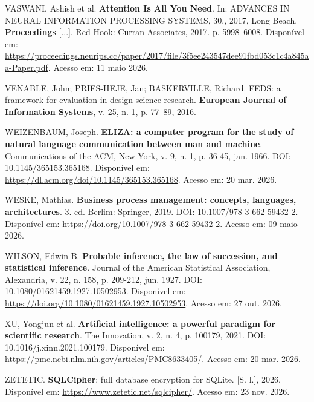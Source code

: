 \documentclass[12pt,a4paper]{extarticle}
\begin{document}
\vspace{0.5cm}\noindent
VASWANI, Ashish et al. \textbf{Attention Is All You Need}. In: ADVANCES IN NEURAL INFORMATION PROCESSING SYSTEMS, 30., 2017, Long Beach. \textbf{Proceedings} [...]. Red Hook: Curran Associates, 2017. p. 5998--6008. Disponível em: \url{https://proceedings.neurips.cc/paper/2017/file/3f5ee243547dee91fbd053c1c4a845aa-Paper.pdf}. Acesso em: 11 maio 2026.

\vspace{0.5cm}\noindent
VENABLE, John; PRIES-HEJE, Jan; BASKERVILLE, Richard. FEDS: a framework for evaluation in design science research. \textbf{European Journal of Information Systems}, v. 25, n. 1, p. 77--89, 2016.

\vspace{0.5cm}\noindent
WEIZENBAUM, Joseph. \textbf{ELIZA: a computer program for the study of natural language communication between man and machine}. Communications of the ACM, New York, v. 9, n. 1, p. 36-45, jan. 1966. DOI: 10.1145/365153.365168. Disponível em: \url{https://dl.acm.org/doi/10.1145/365153.365168}. Acesso em: 20 mar. 2026.

\vspace{0.5cm}\noindent
WESKE, Mathias. \textbf{Business process management: concepts, languages, architectures}. 3. ed. Berlim: Springer, 2019. DOI: 10.1007/978-3-662-59432-2. Disponível em: \url{https://doi.org/10.1007/978-3-662-59432-2}. Acesso em: 09 maio 2026.

\vspace{0.5cm}\noindent
WILSON, Edwin B. \textbf{Probable inference, the law of succession, and statistical inference}. Journal of the American Statistical Association, Alexandria, v. 22, n. 158, p. 209-212, jun. 1927. DOI: 10.1080/01621459.1927.10502953. Disponível em: \url{https://doi.org/10.1080/01621459.1927.10502953}. Acesso em: 27 out. 2026.

\vspace{0.5cm}\noindent
XU, Yongjun et al. \textbf{Artificial intelligence: a powerful paradigm for scientific research}. The Innovation, v. 2, n. 4, p. 100179, 2021. DOI: 10.1016/j.xinn.2021.100179. Disponível em: \url{https://pmc.ncbi.nlm.nih.gov/articles/PMC8633405/}. Acesso em: 20 mar. 2026.

\vspace{0.5cm}\noindent
ZETETIC. \textbf{SQLCipher}: full database encryption for SQLite. [S. l.], 2026. Disponível em: \url{https://www.zetetic.net/sqlcipher/}. Acesso em: 23 nov. 2026.
\end{document}
